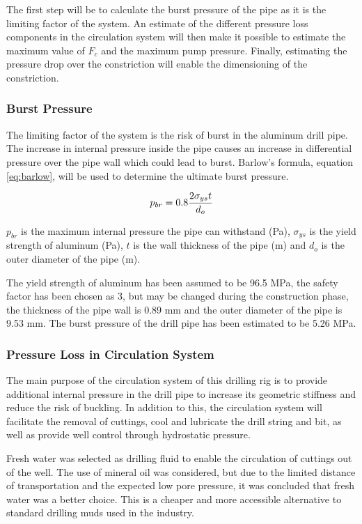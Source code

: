 The first step will be to calculate the burst pressure of the pipe as it is the limiting factor of the system. An estimate of the different pressure loss components in the circulation system will then make it possible to estimate the maximum value of $F_c$ and the maximum pump pressure. Finally, estimating the pressure drop over the constriction will enable the dimensioning of the constriction.

\subsubsection{Burst Pressure} \label{sssec:burst}
The limiting factor of the system is the risk of burst in the aluminum drill pipe. The increase in internal pressure inside the pipe causes an increase in differential pressure over the pipe wall which could lead to burst. Barlow’s formula, equation \ref{eq:barlow}, will be used to determine the ultimate burst pressure. 

\begin{equation}
\centering
   p_{br}=0.8 \frac{2 \sigma_{ys} t}{d_o}
\label{eq:barlow}
\end{equation}

$p_{br}$  is the maximum internal pressure the pipe can withstand (Pa), $\sigma_{ys}$ is the yield strength of aluminum (Pa), $t$ is the wall thickness of the pipe (m) and $d_o$ is the outer diameter of the pipe (m).

The yield strength of aluminum has been assumed to be 96.5 MPa, the safety factor has been chosen as 3, but may be changed during the construction phase, the thickness of the pipe wall is 0.89 mm and the outer diameter of the pipe is 9.53 mm. The burst pressure of the drill pipe has been estimated to be 5.26 MPa.

\subsubsection{Pressure Loss in Circulation System} \label{sssec:pressureloss}
The main purpose of the circulation system of this drilling rig is to provide additional internal pressure in the drill pipe to increase its geometric stiffness and reduce the risk of buckling. In addition to this, the circulation system will facilitate the removal of cuttings, cool and lubricate the drill string and bit, as well as provide well control through hydrostatic pressure. 

Fresh water was selected as drilling fluid to enable the circulation of cuttings out of the well. The use of mineral oil was considered, but due to the limited distance of transportation and the expected low pore pressure, it was concluded that fresh water was a better choice. This is a cheaper and more accessible alternative to standard drilling muds used in the industry.

